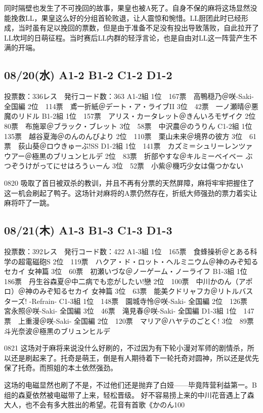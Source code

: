 同时隔壁也发生了不可挽回的故事，果皇也被A死了。自身不保的麻将这场显然没能挽救LL，果皇这么好的分组首轮败退，让人震惊和惋惜。LL厨团此时已经形成，当时虽有足以挽回的票数，但是由于准备不足没有投出导致落败，自此拉开了LL坎坷的日萌征程。当时赛后LL内群的轻浮言论，也是自由对LL这一阵营产生不满的开端。

\subsection{08/20(水) A1-2 B1-2 C1-2 D1-2}

	投票数：336レス　発行コード数：363
	A1-2組
	1位　167票　高鴨穏乃＠咲-Saki- 全国編
	2位　114票　鳶一折紙＠デート・ア・ライブII
	3位　42票　一ノ瀬晴＠悪魔のリドル
	B1-2組
	1位　157票　アリス・カータレット＠きんいろモザイク
	2位　80票　布施翠＠ブラック・ブレット
	3位　58票　中沢農＠のうりん
	C1-2組
	1位　135票　越谷夏海＠のんのんびより
	2位　110票　栗山未来＠境界の彼方
	3位　61票　荻山葵＠ロウきゅーぶ!SS
	D1-2組
	1位　141票　カズミ＝シュリーレンツァウアー＠極黒のブリュンヒルデ
	2位　83票　折部やすな＠キルミーベイベー ぶつぞうけがってにせはろうぃーん
	3位　52票　小紫＠機巧少女は傷つかない

0820 吸取了首日被双杀的教训，并且不再有分票的天然屏障，麻将牢牢把握住了这一机会刷起了鸭子。这场针对麻将的A票仍然存在，折纸大师强劲的票力着实让麻将吓了一跳。

\subsection{08/21(木) A1-3 B1-3 C1-3 D1-3}

	投票数：392レス　発行コード数：422
	A1-3組
	1位　165票　食蜂操祈＠とある科学の超電磁砲S
	2位　119票　ハクア・ド・ロット・ヘルミニウム＠神のみぞ知るセカイ 女神篇
	3位　60票　初瀬いづな＠ノーゲーム・ノーライフ
	B1-3組
	1位　186票　丹生谷森夏＠中二病でも恋がしたい!戀
	2位　100票　中川かのん（アポロ）＠神のみぞ知るセカイ 女神篇
	3位　63票　能美クドリャフカ＠リトルバスターズ! -Refrain-
	C1-3組
	1位　148票　園城寺怜＠咲-Saki- 全国編
	2位　126票　宮永照＠咲-Saki- 全国編
	3位　46票　滝見春＠咲-Saki- 全国編
	D1-3組
	1位　147票　上重漫＠咲-Saki- 全国編
	2位　120票　マリア＠ハヤテのごとく!
	3位　89票　斗光奈波＠極黒のブリュンヒルデ

0821 这场对于麻将来说没什么好刷的，不过因为有下轮小漫对军师的剧情杀，所以还是刷起来了。托奇是萌王，倒是有人期待着下一轮托奇对圆神，所以还是优先保了托奇。而照姐的本土依然强劲。

这场的电磁显然也刷了不是，不过他们还是抛弃了白娅——毕竟阵营利益第一。B组的森夏依然被电磁带了上来，轻松晋级。
好不容易捞上来的中川花音遇上了森大人，也不会有多大胜出的希望。花音有首歌《かのん100%


